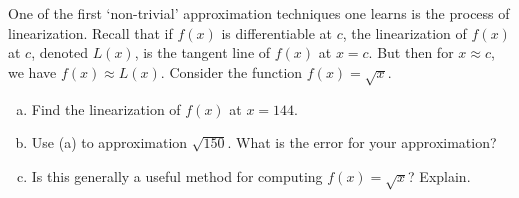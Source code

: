 \documentclass[11pt,letterpaper]{article}
\begin{document}
\newpage 



 One of the first `non-trivial' approximation techniques one learns is the process of linearization. Recall that if $f(x)$ is differentiable at $c$, the linearization of $f(x)$ at $c$, denoted $L(x)$, is the tangent line of $f(x)$ at $x= c$. But then for $x \approx c$, we have $f(x) \approx L(x)$. Consider the function $f(x)= \sqrt{x}$. 
	\begin{enumerate}[(a)]
	\item Find the linearization of $f(x)$ at $x= 144$. 
	\item Use (a) to approximation $\sqrt{150}$. What is the error for your approximation?
	\item Is this generally a useful method for computing $f(x)= \sqrt{x}$? Explain. 
	\end{enumerate} \pspace
\end{document}
